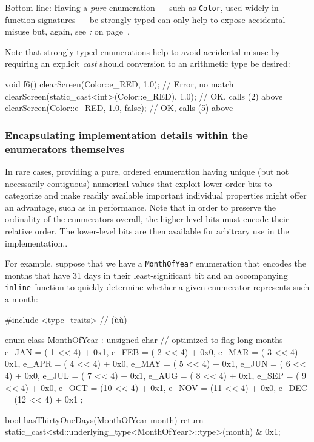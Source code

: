 \noindent Bottom line: Having a \emph{pure} enumeration --- such as
\texttt{Color}, used widely in function signatures --- be strongly typed
can only help to expose accidental misuse but, again, see
\textit{: } on page~\pageref{strong-typing-of-an-enum-class-can-be-counterproductive}.

Note that strongly typed enumerations help to avoid accidental misuse by
requiring an explicit \emph{cast} should conversion to an arithmetic
type be desired:

\begin{emcppslisting}[emcppsbatch=e10]
void f6()
{
    clearScreen(Color::e_RED, 1.0);                   // Error, no match
    clearScreen(static_cast<int>(Color::e_RED), 1.0); // OK, calls (2) above
    clearScreen(Color::e_RED, 1.0, false);            // OK, calls (5) above
}
\end{emcppslisting}


\subsubsection[Encapsulating implementation details within the enumerators themselves]{Encapsulating implementation details within the enumerators themselves}\label{encapsulating-implementation-details-within-the-enumerators-themselves}

In rare cases, providing a pure, ordered enumeration having unique (but
not necessarily contiguous) numerical values that exploit lower-order
bits to categorize and make readily available important
individual properties might offer an advantage, such as in performance. Note that in order to preserve the ordinality of the enumerators
overall, the higher-level bits must encode their relative order. The
lower-level bits are then available for arbitrary use in the
  implementation..

For example, suppose that we have a \texttt{MonthOfYear} enumeration
that encodes the months that have 31 days in their least-significant bit
and an accompanying \texttt{inline} function to quickly determine
whether a given enumerator represents such a month:

\begin{emcppslisting}
#include <type_traits>  // (ù{}ù)

enum class MonthOfYear : unsigned char  // optimized to flag long months
{
    e_JAN = ( 1 << 4) + 0x1,
    e_FEB = ( 2 << 4) + 0x0,
    e_MAR = ( 3 << 4) + 0x1,
    e_APR = ( 4 << 4) + 0x0,
    e_MAY = ( 5 << 4) + 0x1,
    e_JUN = ( 6 << 4) + 0x0,
    e_JUL = ( 7 << 4) + 0x1,
    e_AUG = ( 8 << 4) + 0x1,
    e_SEP = ( 9 << 4) + 0x0,
    e_OCT = (10 << 4) + 0x1,
    e_NOV = (11 << 4) + 0x0,
    e_DEC = (12 << 4) + 0x1
};

bool hasThirtyOneDays(MonthOfYear month)
{
    return static_cast<std::underlying_type<MonthOfYear>::type>(month) & 0x1;
}
\end{emcppslisting}

